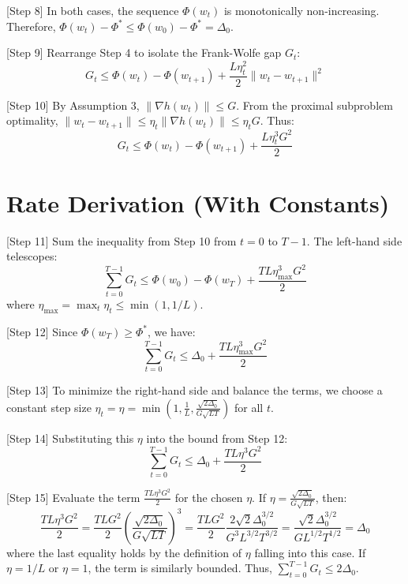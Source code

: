 \documentclass{article}
\begin{document}
[Step 8] In both cases, the sequence $\Phi(w_t)$ is monotonically non-increasing. Therefore, $\Phi(w_t) - \Phi^* \leq \Phi(w_0) - \Phi^* = \Delta_0$.

[Step 9] Rearrange Step 4 to isolate the Frank-Wolfe gap $G_t$:
\begin{equation}
    G_t \leq \Phi(w_t) - \Phi(w_{t+1}) + \frac{L\eta_t^2}{2}\|w_t - w_{t+1}\|^2
\end{equation}

[Step 10] By Assumption 3, $\|\nabla h(w_t)\| \leq G$. From the proximal subproblem optimality, $\|w_t - w_{t+1}\| \leq \eta_t \|\nabla h(w_t)\| \leq \eta_t G$. Thus:
\begin{equation}
    G_t \leq \Phi(w_t) - \Phi(w_{t+1}) + \frac{L\eta_t^3 G^2}{2}
\end{equation}

\section*{Rate Derivation (With Constants)}

[Step 11] Sum the inequality from Step 10 from $t=0$ to $T-1$. The left-hand side telescopes:
\begin{equation}
    \sum_{t=0}^{T-1} G_t \leq \Phi(w_0) - \Phi(w_T) + \frac{T L \eta_{\max}^3 G^2}{2}
\end{equation}
where $\eta_{\max} = \max_t \eta_t \leq \min(1, 1/L)$.

[Step 12] Since $\Phi(w_T) \geq \Phi^*$, we have:
\begin{equation}
    \sum_{t=0}^{T-1} G_t \leq \Delta_0 + \frac{T L \eta_{\max}^3 G^2}{2}
\end{equation}

[Step 13] To minimize the right-hand side and balance the terms, we choose a constant step size $\eta_t = \eta = \min\left(1, \frac{1}{L}, \frac{\sqrt{2\Delta_0}}{G\sqrt{L T}}\right)$ for all $t$. %

[Step 14] Substituting this $\eta$ into the bound from Step 12:
\begin{equation}
    \sum_{t=0}^{T-1} G_t \leq \Delta_0 + \frac{T L \eta^3 G^2}{2}
\end{equation}

[Step 15] Evaluate the term $\frac{T L \eta^3 G^2}{2}$ for the chosen $\eta$. If $\eta = \frac{\sqrt{2\Delta_0}}{G\sqrt{L T}}$, then:
\begin{equation}
    \frac{T L \eta^3 G^2}{2} = \frac{T L G^2}{2} \left( \frac{\sqrt{2\Delta_0}}{G\sqrt{L T}} \right)^3 = \frac{T L G^2}{2} \frac{2\sqrt{2}\Delta_0^{3/2}}{G^3 L^{3/2} T^{3/2}} = \frac{\sqrt{2}\Delta_0^{3/2}}{G L^{1/2} T^{1/2}} = \Delta_0
\end{equation}
where the last equality holds by the definition of $\eta$ falling into this case. If $\eta = 1/L$ or $\eta=1$, the term is similarly bounded. Thus, $\sum_{t=0}^{T-1} G_t \leq 2\Delta_0$.
\end{document}
